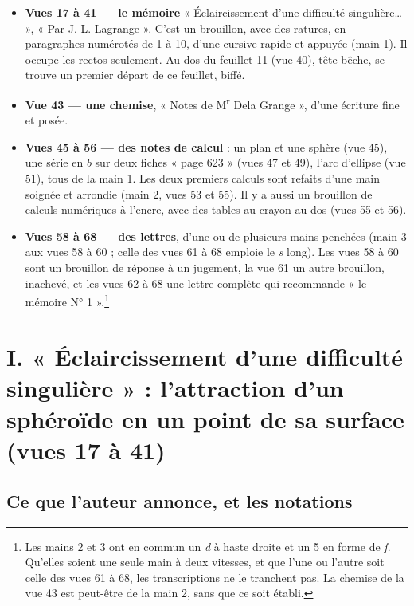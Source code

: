 \documentclass[11pt,a4paper]{article}
\begin{document}
\begin{itemize}
  \item \textbf{Vues 17 à 41 — le mémoire} « Éclaircissement d'une difficulté
    singulière… », « Par J. L. Lagrange ». C'est un brouillon, avec des
    ratures, en paragraphes numérotés de 1 à 10, d'une cursive rapide et
    appuyée (main 1). Il occupe les rectos seulement. Au dos du feuillet 11
    (vue 40), tête-bêche, se trouve un premier départ de ce feuillet, biffé.
  \item \textbf{Vue 43 — une chemise}, « Notes de M\textsuperscript{r} Dela
    Grange », d'une écriture fine et posée.
  \item \textbf{Vues 45 à 56 — des notes de calcul} : un plan et une sphère
    (vue 45), une série en \(b\) sur deux fiches « page 623 » (vues 47 et 49),
    l'arc d'ellipse (vue 51), tous de la main 1. Les deux premiers calculs
    sont refaits d'une main soignée et arrondie (main 2, vues 53 et 55). Il y a
    aussi un brouillon de calculs numériques à l'encre, avec des tables au
    crayon au dos (vues 55 et 56).
  \item \textbf{Vues 58 à 68 — des lettres}, d'une ou de plusieurs mains
    penchées (main 3 aux vues 58 à 60 ; celle des vues 61 à 68 emploie le
    \emph{s} long). Les vues 58 à 60 sont un brouillon de réponse à un
    jugement, la vue 61 un autre brouillon, inachevé, et les vues 62 à 68 une
    lettre complète qui recommande « le mémoire N° 1 ».\footnote{Les mains 2 et
    3 ont en commun un \emph{d} à haste droite et un 5 en forme de \emph{ſ}.
    Qu'elles soient une seule main à deux vitesses, et que l'une ou l'autre
    soit celle des vues 61 à 68, les transcriptions ne le tranchent pas. La
    chemise de la vue 43 est peut-être de la main 2, sans que ce soit établi.}
\end{itemize}

\section*{I. « Éclaircissement d'une difficulté singulière » : l'attraction d'un sphéroïde en un point de sa surface (vues 17 à 41)}

\subsection*{Ce que l'auteur annonce, et les notations}
\end{document}
